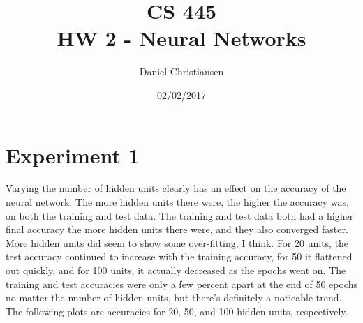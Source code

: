 \documentclass{article}
\title{CS 445 \\ HW 2 - Neural Networks}
\author{Daniel Christiansen}
\date{02/02/2017}
\begin{document}
\maketitle

\clearpage
\section{Experiment 1}

\begin{flushleft}
Varying the number of hidden units clearly has an effect on the accuracy of the neural network.  The more hidden units there were, the higher the accuracy was, on both the training and test data.  The training and test data both had a higher final accuracy the more hidden units there were, and they also converged faster.  More hidden units did seem to show some over-fitting, I think.  For 20 units, the test accuracy continued to increase with the training accuracy, for 50 it flattened out quickly, and for 100 units, it actually decreased as the epochs went on.  The training and test accuracies were only a few percent apart at the end of 50 epochs no matter the number of hidden units, but there's definitely a noticable trend.  The following plots are accuracies for 20, 50, and 100 hidden units, respectively.
\end{flushleft}

\begin{figure}[h!]
\centering
{}
\end{figure}

\begin{figure}[h!]
\centering
{}
\end{figure}
\end{document}
